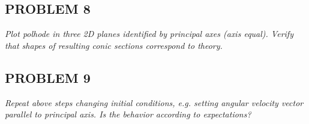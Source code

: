 \subsection{PROBLEM 8}
\textit{Plot polhode in three 2D planes identified by principal axes (axis equal). Verify that shapes of resulting conic sections correspond to theory.}



\subsection{PROBLEM 9}
\textit{Repeat above steps changing initial conditions, e.g. setting angular velocity vector parallel to principal axis. Is the behavior according to expectations?}

